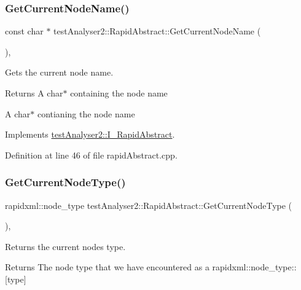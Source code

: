 \subsubsection{\texorpdfstring{GetCurrentNodeName()}{GetCurrentNodeName()}}
{\footnotesize\ttfamily const char $\ast$ test\+Analyser2\+::\+Rapid\+Abstract\+::\+Get\+Current\+Node\+Name (\begin{DoxyParamCaption}{ }\end{DoxyParamCaption})\hspace{0.3cm}{\ttfamily [override]}, {\ttfamily [virtual]}}



Gets the current node name. 

\begin{DoxyReturn}{Returns}
A char$\ast$ containing the node name

A char$\ast$ contianing the node name 
\end{DoxyReturn}


Implements \mbox{\hyperlink{classtestAnalyser2_1_1I__RapidAbstract_af94009549a9590806e5d8164ebca3c15}{test\+Analyser2\+::\+I\+\_\+\+Rapid\+Abstract}}.



Definition at line 46 of file rapid\+Abstract.\+cpp.

\mbox{\label{classtestAnalyser2_1_1RapidAbstract_a9897ce59179b6bf0a0e76845931f39fb}} 
\subsubsection{\texorpdfstring{GetCurrentNodeType()}{GetCurrentNodeType()}}
{\footnotesize\ttfamily rapidxml\+::node\+\_\+type test\+Analyser2\+::\+Rapid\+Abstract\+::\+Get\+Current\+Node\+Type (\begin{DoxyParamCaption}{ }\end{DoxyParamCaption})\hspace{0.3cm}{\ttfamily [override]}, {\ttfamily [virtual]}}



Returns the current node\textquotesingle{}s type. 

\begin{DoxyReturn}{Returns}
The node type that we have encountered as a rapidxml\+::node\+\_\+type\+:\+:\mbox{[}type\mbox{]} 
\end{DoxyReturn}


